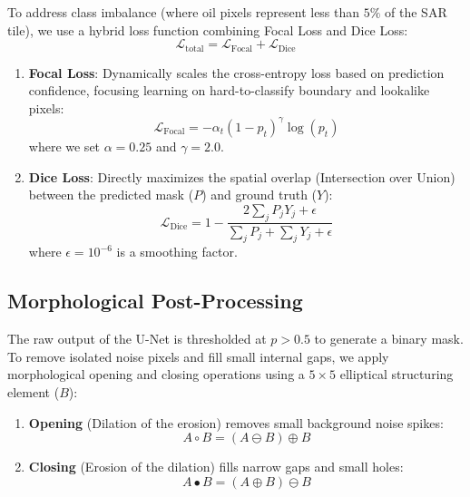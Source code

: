 \documentclass[conference]{IEEEtran}
\begin{document}
To address class imbalance (where oil pixels represent less than $5\%$ of the SAR tile), we use a hybrid loss function combining Focal Loss and Dice Loss:
\begin{equation}
\mathcal{L}_{\text{total}} = \mathcal{L}_{\text{Focal}} + \mathcal{L}_{\text{Dice}}
\end{equation}
\begin{enumerate}
\item \textbf{Focal Loss}: Dynamically scales the cross-entropy loss based on prediction confidence, focusing learning on hard-to-classify boundary and lookalike pixels:
   \begin{equation}
   \mathcal{L}_{\text{Focal}} = -\alpha_t (1 - p_t)^\gamma \log(p_t)
   \end{equation}
   where we set $\alpha = 0.25$ and $\gamma = 2.0$.
\item \textbf{Dice Loss}: Directly maximizes the spatial overlap (Intersection over Union) between the predicted mask ($P$) and ground truth ($Y$):
   \begin{equation}
   \mathcal{L}_{\text{Dice}} = 1 - \frac{2 \sum_{j} P_j Y_j + \epsilon}{\sum_{j} P_j + \sum_{j} Y_j + \epsilon}
   \end{equation}
   where $\epsilon = 10^{-6}$ is a smoothing factor.
\end{enumerate}

\subsection{Morphological Post-Processing}
The raw output of the U-Net is thresholded at $p > 0.5$ to generate a binary mask. To remove isolated noise pixels and fill small internal gaps, we apply morphological opening and closing operations using a $5 \times 5$ elliptical structuring element ($B$):
\begin{enumerate}
\item \textbf{Opening} (Dilation of the erosion) removes small background noise spikes:
   \begin{equation}
   A \circ B = (A \ominus B) \oplus B
   \end{equation}
\item \textbf{Closing} (Erosion of the dilation) fills narrow gaps and small holes:
   \begin{equation}
   A \bullet B = (A \oplus B) \ominus B
   \end{equation}
\end{enumerate}
\end{document}
